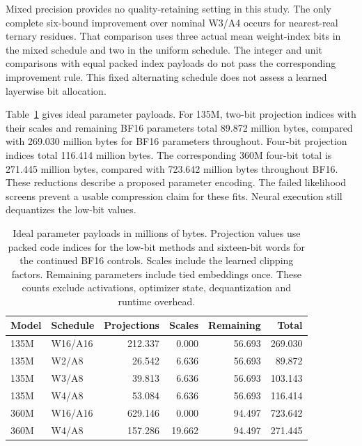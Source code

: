 \documentclass[11pt]{article}
\begin{document}
Mixed precision provides no quality-retaining setting in this study.
The only complete six-bound improvement over nominal W3/A4 occurs for
nearest-real ternary residues. That comparison uses three actual mean
weight-index bits in the mixed schedule and two in the uniform schedule.
The integer and unit comparisons with equal packed index payloads do
not pass the corresponding improvement rule. This fixed alternating
schedule does not assess a learned layerwise bit allocation.

Table~\ref{tab:low-precision-storage} gives ideal parameter payloads.
For 135M, two-bit projection indices with their scales and remaining BF16
parameters total 89.872 million bytes, compared with 269.030 million
bytes for BF16 parameters throughout. Four-bit projection indices total
116.414 million bytes. The corresponding 360M four-bit total is
271.445 million bytes, compared with 723.642 million bytes throughout
BF16. These reductions describe a proposed parameter encoding. The
failed likelihood screens prevent a usable compression claim for these
fits. Neural execution still dequantizes the low-bit values.

\begin{table}[htbp]
\centering\small
\caption{Ideal parameter payloads in millions of bytes. Projection values use packed code indices for the low-bit methods and sixteen-bit words for the continued BF16 controls. Scales include the learned clipping factors. Remaining parameters include tied embeddings once. These counts exclude activations, optimizer state, dequantization and runtime overhead.}
\label{tab:low-precision-storage}
\begin{tabular}{llrrrr}
\toprule
Model & Schedule & Projections & Scales & Remaining & Total\\
\midrule
135M & W16/A16 & 212.337 & 0.000 & 56.693 & 269.030 \\
135M & W2/A8 & 26.542 & 6.636 & 56.693 & 89.872 \\
135M & W3/A8 & 39.813 & 6.636 & 56.693 & 103.143 \\
135M & W4/A8 & 53.084 & 6.636 & 56.693 & 116.414 \\
360M & W16/A16 & 629.146 & 0.000 & 94.497 & 723.642 \\
360M & W4/A8 & 157.286 & 19.662 & 94.497 & 271.445 \\
\bottomrule
\end{tabular}
\end{table}
\end{document}
